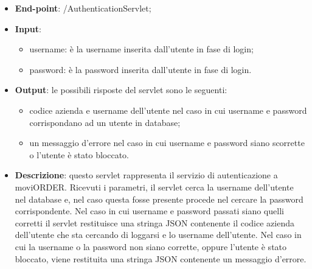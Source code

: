 
\begin{itemize}
	\item \textbf{End-point}: /AuthenticationServlet;
	\item \textbf{Input}:
		\begin{itemize}
			\item username: è la username inserita dall'utente in fase di login;
			\item password: è la password inserita dall'utente in fase di login.
		\end{itemize}
	\item \textbf{Output}: le possibili risposte del servlet sono le seguenti:
		\begin{itemize}
			\item codice azienda e username dell'utente nel caso in cui username e password corrispondano ad un utente in database;
			\item un messaggio d'errore nel caso in cui username e password siano scorrette o l'utente è stato bloccato. 
		\end{itemize}
		\item \textbf{Descrizione}: questo servlet rappresenta il servizio di autenticazione a moviORDER. Ricevuti i parametri, il servlet cerca la username dell'utente nel database e, nel caso questa fosse presente procede nel cercare la password corrispondente. Nel caso in cui username e password passati siano quelli corretti il servlet restituisce una stringa JSON contenente il codice azienda dell'utente che sta cercando di loggarsi e lo username dell'utente. Nel caso in cui la username o la password non siano corrette, oppure l'utente è stato bloccato, viene restituita una stringa JSON contenente un messaggio d'errore.
\end{itemize}


